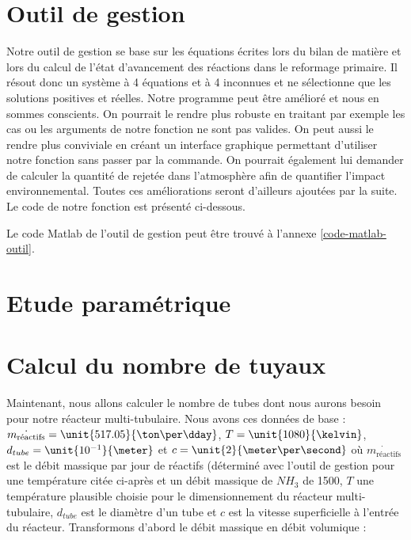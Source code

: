 \section{Outil de gestion}
Notre outil de gestion se base sur les équations écrites lors du
bilan de matière et lors du calcul de l'état d'avancement des réactions
dans le reformage primaire. Il résout donc un système à 4 équations
et à 4 inconnues et ne sélectionne que les solutions positives et réelles. Notre programme
peut être amélioré et nous en sommes conscients. On pourrait le rendre plus robuste 
en traitant par exemple les cas ou les arguments de notre fonction ne sont pas 
valides. On peut aussi le rendre plus conviviale en créant un interface graphique
permettant d'utiliser notre fonction sans passer par la commande. On pourrait également
lui demander de calculer la quantité de  rejetée dans l'atmosphère afin
de quantifier l'impact environnemental. Toutes ces améliorations seront d'ailleurs ajoutées 
par la suite. Le code de notre fonction est présenté ci-dessous.

Le code Matlab de l'outil de gestion peut être trouvé à l'annexe \ref{code-matlab-outil}.

\section{Etude paramétrique}

\section{Calcul du nombre de tuyaux}
Maintenant, nous allons calculer le nombre de tubes dont nous aurons besoin pour
notre réacteur multi-tubulaire. Nous avons ces données de base : $\dot{m_{\text{réactifs}}} = \unit{517.05}{\ton\per\dday}$, 
$T = \unit{1080}{\kelvin}$, $d_{tube} = \unit{10^{-1}}{\meter}$ et $c = \unit{2}{\meter\per\second}$ où $\dot{m_{\text{réactifs}}}$ 
est le débit massique par jour de réactifs (déterminé avec l'outil de gestion pour une température citée ci-après et
un débit massique de $NH_{3}$ de \unit{1500}{\ton\per\dday}, $T$ une température plausible choisie pour le dimensionnement
du réacteur multi-tubulaire, $d_{tube}$ est le diamètre d'un tube et $c$ est la vitesse superficielle à l'entrée du réacteur.
Transformons d'abord le débit massique en débit volumique :

